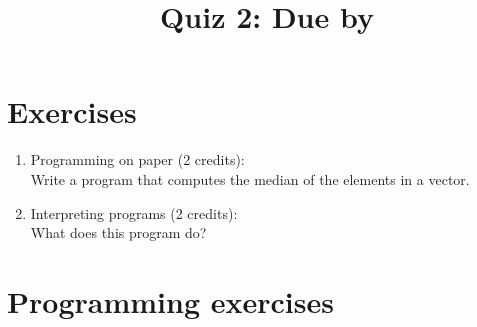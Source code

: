 \documentclass[11pt]{article}
\begin{document}
\title{\coursename~Quiz 2: Due by }
\date{}
\maketitle

\medskip


\section*{Exercises}

\begin{enumerate}
\item Programming on paper (2 credits): \\
Write a program that computes the median of the elements in a vector.

\item Interpreting programs (2 credits): \\
What does this program do?



\end{enumerate}

\section*{Programming exercises}
\end{document}
